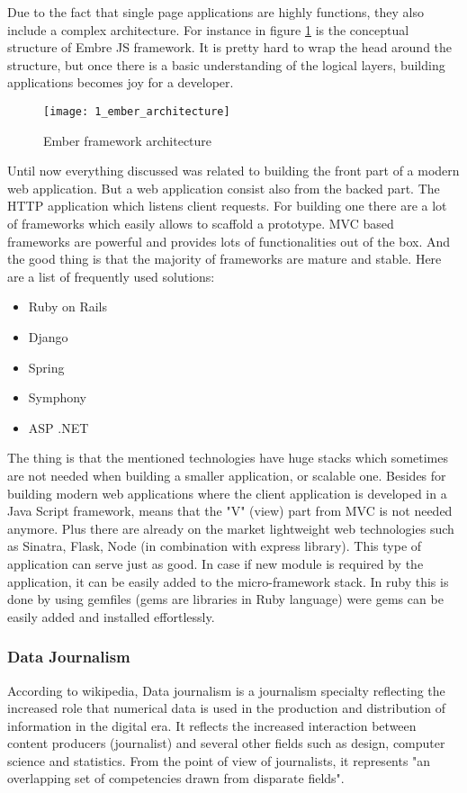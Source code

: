 Due to the fact that single page applications are highly functions, they also include a complex architecture. For instance in figure \ref{ember_architecture} is the conceptual structure of Embre JS framework. It is pretty hard to wrap the head around the structure, but once there is a basic understanding of the logical layers, building applications becomes joy for a developer.

\begin{figure}[!ht]
\centering
\texttt{[image: 1\_ember\_architecture]}
\caption{Ember framework architecture}\label{ember_architecture}
\end{figure}

Until now everything discussed was related to building the front part of a modern web application. But a web application consist also from the backed part. The HTTP application which listens client requests. For building one there are a lot of frameworks which easily allows to scaffold a prototype. MVC based frameworks are powerful and provides lots of functionalities out of the box. And the good thing is that the majority of frameworks are mature and stable. Here are a list of frequently used solutions:
\begin{itemize}
    \item Ruby on Rails
    \item Django
    \item Spring
    \item Symphony
    \item ASP .NET
\end{itemize}
The thing is that the mentioned technologies have huge stacks which sometimes are not needed when building a smaller application, or scalable one. Besides for building modern web applications where the client application is developed in a Java Script framework, means that the "V" (view) part from MVC is not needed anymore. Plus there are already on the market lightweight web technologies such as Sinatra, Flask, Node (in combination with express library). This type of application can serve just as good. In case if new module is required by the application, it can be easily added to the micro-framework stack. In ruby this is done by using gemfiles (gems are libraries in Ruby language) were gems can be easily added and installed effortlessly.

\subsubsection{Data Journalism}
According to wikipedia, Data journalism is a journalism specialty reflecting the increased role that numerical data is used in the production and distribution of information in the digital era. It reflects the increased interaction between content producers (journalist) and several other fields such as design, computer science and statistics. From the point of view of journalists, it represents "an overlapping set of competencies drawn from disparate fields". \cite{wiki_data_journalism}


